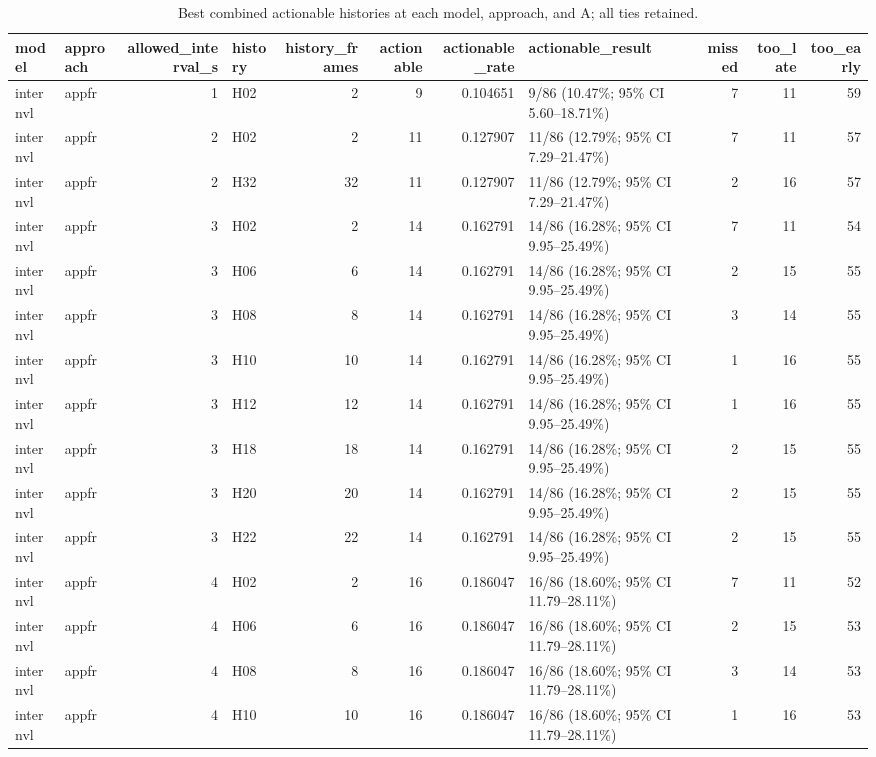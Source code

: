 \begin{table}[tbp]
\caption{Best combined actionable histories at each model, approach, and A; all ties retained.}
\label{tab:rq4-best-histories}
\begin{tabular}{llrlrrrlrrr}
\toprule
model & approach & allowed\_interval\_s & history & history\_frames & actionable & actionable\_rate & actionable\_result & missed & too\_late & too\_early \\
\midrule
internvl & appfr & 1 & H02 & 2 & 9 & 0.104651 & 9/86 (10.47\%; 95\% CI 5.60–18.71\%) & 7 & 11 & 59 \\
internvl & appfr & 2 & H02 & 2 & 11 & 0.127907 & 11/86 (12.79\%; 95\% CI 7.29–21.47\%) & 7 & 11 & 57 \\
internvl & appfr & 2 & H32 & 32 & 11 & 0.127907 & 11/86 (12.79\%; 95\% CI 7.29–21.47\%) & 2 & 16 & 57 \\
internvl & appfr & 3 & H02 & 2 & 14 & 0.162791 & 14/86 (16.28\%; 95\% CI 9.95–25.49\%) & 7 & 11 & 54 \\
internvl & appfr & 3 & H06 & 6 & 14 & 0.162791 & 14/86 (16.28\%; 95\% CI 9.95–25.49\%) & 2 & 15 & 55 \\
internvl & appfr & 3 & H08 & 8 & 14 & 0.162791 & 14/86 (16.28\%; 95\% CI 9.95–25.49\%) & 3 & 14 & 55 \\
internvl & appfr & 3 & H10 & 10 & 14 & 0.162791 & 14/86 (16.28\%; 95\% CI 9.95–25.49\%) & 1 & 16 & 55 \\
internvl & appfr & 3 & H12 & 12 & 14 & 0.162791 & 14/86 (16.28\%; 95\% CI 9.95–25.49\%) & 1 & 16 & 55 \\
internvl & appfr & 3 & H18 & 18 & 14 & 0.162791 & 14/86 (16.28\%; 95\% CI 9.95–25.49\%) & 2 & 15 & 55 \\
internvl & appfr & 3 & H20 & 20 & 14 & 0.162791 & 14/86 (16.28\%; 95\% CI 9.95–25.49\%) & 2 & 15 & 55 \\
internvl & appfr & 3 & H22 & 22 & 14 & 0.162791 & 14/86 (16.28\%; 95\% CI 9.95–25.49\%) & 2 & 15 & 55 \\
internvl & appfr & 4 & H02 & 2 & 16 & 0.186047 & 16/86 (18.60\%; 95\% CI 11.79–28.11\%) & 7 & 11 & 52 \\
internvl & appfr & 4 & H06 & 6 & 16 & 0.186047 & 16/86 (18.60\%; 95\% CI 11.79–28.11\%) & 2 & 15 & 53 \\
internvl & appfr & 4 & H08 & 8 & 16 & 0.186047 & 16/86 (18.60\%; 95\% CI 11.79–28.11\%) & 3 & 14 & 53 \\
internvl & appfr & 4 & H10 & 10 & 16 & 0.186047 & 16/86 (18.60\%; 95\% CI 11.79–28.11\%) & 1 & 16 & 53 \\

\end{tabular}
\end{table}
